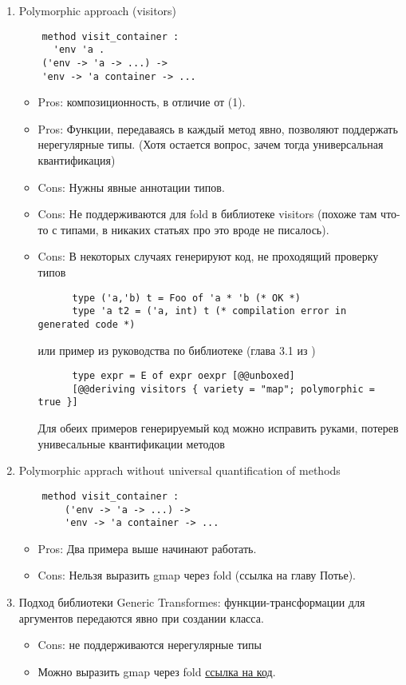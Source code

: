 \documentclass[acmsmall,review,anonymous]{acmart}\settopmatter{printfolios=true,printccs=false,printacmref=false}
\begin{document}
\begin{enumerate}
  \item Polymorphic approach (visitors)
    \begin{lstlisting}
    method visit_container :
      'env 'a .
	('env -> 'a -> ...) ->
	'env -> 'a container -> ...
    \end{lstlisting}
    \begin{itemize}
    \item Pros: композиционность,  в отличие от (1).
    \item Pros: Функции, передаваясь в каждый метод явно, позволяют поддержать нерегулярные типы. 
    (Хотя остается вопрос, зачем тогда универсальная квантификация)
    \item Cons: Нужны явные аннотации типов.
    \item Cons: Не поддерживаются для fold в библиотеке visitors (похоже там что-то с типами, в никаких статьях про это вроде не писалось).
    \item Cons: В некоторых случаях генерируют код, не проходящий проверку типов
	  \begin{lstlisting}
	  type ('a,'b) t = Foo of 'a * 'b (* OK *)
	  type 'a t2 = ('a, int) t (* compilation error in generated code *)
	  \end{lstlisting}
	  или пример из руководства по библиотеке (глава 3.1 из \cite{visitors_manual})
	  \begin{lstlisting}
	  type expr = E of expr oexpr [@@unboxed]
	  [@@deriving visitors { variety = "map"; polymorphic = true }]
	  \end{lstlisting}
	  Для обеих примеров генерируемый код можно исправить руками, потерев унивесальные квантификации методов
    \end{itemize}
  \item Polymorphic apprach without universal quantification of methods
      \begin{lstlisting}
	method visit_container :
	    ('env -> 'a -> ...) ->
	    'env -> 'a container -> ...
    \end{lstlisting}
    \begin{itemize}
    \item Pros: Два примера выше начинают работать.
    \item Cons: Нельзя выразить gmap через fold (ссылка на главу Потье).
    \end{itemize}
    
  \item Подход библиотеки Generic Transformes: функции-трансформации для аргументов передаются явно при создании класса.
    \begin{itemize}
    \item Cons: не поддерживаются нерегулярные типы
    \item Можно выразить gmap через fold \href{https://github.com/Kakadu/gt-demo/blob/master/src/demo06.ml}{ссылка на код}.
    \end{itemize}    
\end{enumerate}
\end{document}
